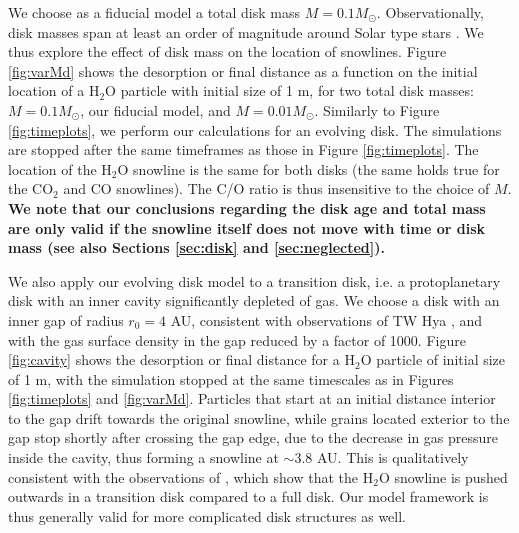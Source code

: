 \documentclass[apj]{emulateapj}
\begin{document}
We choose as a fiducial model a total disk mass $M=0.1 M_{\odot}$. Observationally, disk masses span at least an order of magnitude around Solar type stars %
\citep{andrews13}. %
We thus explore the effect of disk mass on the location of snowlines. Figure \ref{fig:varMd} shows the desorption or final distance as a function on the initial location of a H$_2$O particle with initial size of 1 m, for two total disk masses: $M=0.1 M_{\odot}$, our fiducial model, and $M=0.01 M_{\odot}$. Similarly to Figure \ref{fig:timeplots}, we perform our calculations for an evolving disk. The simulations are stopped after the same timeframes as those in Figure \ref{fig:timeplots}. The location of the H$_2$O snowline is the same for both disks (the same holds true for the CO$_2$ and CO snowlines). The C/O ratio is thus insensitive to the choice of $M$. \textbf{We note that our conclusions regarding the disk age and total mass are only valid if the snowline itself does not move with time or disk mass (see also Sections \ref{sec:disk} and \ref{sec:neglected}).}


We also apply our evolving disk model to a transition disk, i.e. a protoplanetary disk with an inner cavity significantly depleted of gas. We choose a disk with an inner gap of radius $r_0=4$ AU, consistent with observations of TW Hya \citep{zhang13}, and with the gas surface density in the gap reduced by a factor of 1000. Figure \ref{fig:cavity} shows the desorption or final distance for a H$_2$O particle of initial size of 1 m, with the simulation stopped at the same timescales as in Figures \ref{fig:timeplots} and \ref{fig:varMd}. Particles that start at an initial distance interior to the gap drift towards the original snowline, while grains located exterior to the gap stop shortly after crossing the gap edge, due to the decrease in gas pressure inside the cavity, thus forming a snowline at $\sim$$3.8$ AU. This is qualitatively consistent with the observations of \citet{zhang13}, which show that the H$_2$O snowline is pushed outwards in a transition disk compared to a full disk. Our model framework is thus generally valid for more complicated disk structures as well.  
\end{document}
